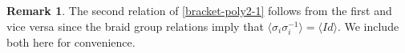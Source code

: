 \documentclass{amsart}
\newcommand{\hackcenter}[1]{
 \xy (0,0)*{#1}; \endxy}
\theoremstyle{plain}
\theoremstyle{definition}
\newtheorem{definition}[theorem]{Definition}
\theoremstyle{definition}
\newtheorem{remark}[theorem]{Remark}
\numberwithin{equation}{section}
\numberwithin{theorem}{section}
\numberwithin{equation}{section}
\def\Z{{\mathbbm Z}}
\begin{document}

\begin{remark}
  The second relation of \eqref{bracket-poly2-1} follows from the first and vice versa since the braid group relations imply that $\langle \sigma_i \sigma_i^{-1}\rangle=\langle Id \rangle $. We include both here for convenience.
\end{remark}
\end{document}
